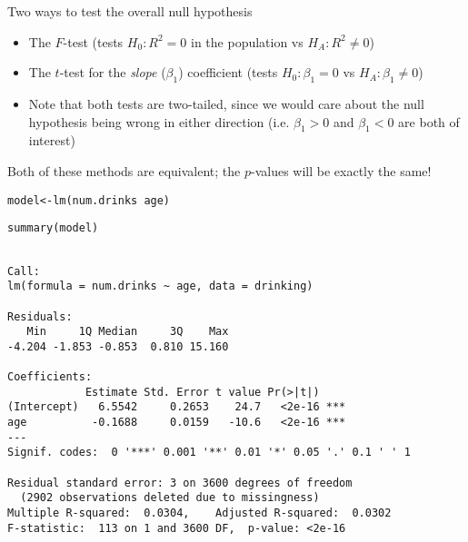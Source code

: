 \documentclass{beamer}\usepackage[]{graphicx}\usepackage[]{color}
\makeatletter
\newcommand{\hlopt}[1]{\textcolor[rgb]{1,0.894,0.769}{#1}}%
\newcommand{\hlstd}[1]{\textcolor[rgb]{1,0.894,0.769}{#1}}%
\newcommand{\hlkwb}[1]{\textcolor[rgb]{0.804,0.776,0.451}{#1}}%
\newcommand{\hlkwd}[1]{\textcolor[rgb]{1,0.78,0.769}{#1}}%
\newenvironment{kframe}{%
 \def\at@end@of@kframe{}%
 \ifinner\ifhmode%
  \def\at@end@of@kframe{\end{minipage}}%
  \begin{minipage}{\columnwidth}%
 \fi\fi%
 \def\FrameCommand##1{\hskip\@totalleftmargin \hskip-\fboxsep
 \colorbox{shadecolor}{##1}\hskip-\fboxsep
     \hskip-\linewidth \hskip-\@totalleftmargin \hskip\columnwidth}%
 \MakeFramed {\advance\hsize-\width
   \@totalleftmargin\z@ \linewidth\hsize
   \@setminipage}}%
 {\par\unskip\endMakeFramed%
 \at@end@of@kframe}
\newenvironment{knitrout}{}{} %
\makeatother
\begin{document}
\begin{darkframes}
    \begin{frame}{Two ways to test the overall null hypothesis}
      \begin{itemize}
        \item The $F$-test (tests $H_0:R^2=0$ in the population vs $H_A:R^2\neq 0$)
        \item The $t$-test for the \emph{slope} ($\beta_1$) coefficient (tests $H_0:\beta_1=0$ vs $H_A:\beta_1\neq 0$)
        \item Note that both tests are two-tailed, since we would care about the null hypothesis being wrong in either direction (i.e. $\beta_1>0$ and $\beta_1<0$ are both of interest)
      \end{itemize}
      \pause
      Both of these methods are equivalent; the $p$-values will be exactly the same!
    \end{frame}

    \begin{frame}[fragile]
      \fontsize{9}{9}\selectfont
\begin{knitrout}
\color{fgcolor}\begin{kframe}
\begin{alltt}
\hlstd{model} \hlkwb{<-} \hlkwd{lm}\hlstd{(num.drinks} \hlopt{~} \hlstd{age)}
\end{alltt}


{\ttfamily\noindent\bfseries\color{errorcolor}{Error in eval(predvars, data, env): object 'num.drinks' not found}}\begin{alltt}
\hlkwd{summary}\hlstd{(model)}
\end{alltt}
\begin{verbatim}

Call:
lm(formula = num.drinks ~ age, data = drinking)

Residuals:
   Min     1Q Median     3Q    Max 
-4.204 -1.853 -0.853  0.810 15.160 

Coefficients:
            Estimate Std. Error t value Pr(>|t|)    
(Intercept)   6.5542     0.2653    24.7   <2e-16 ***
age          -0.1688     0.0159   -10.6   <2e-16 ***
---
Signif. codes:  0 '***' 0.001 '**' 0.01 '*' 0.05 '.' 0.1 ' ' 1

Residual standard error: 3 on 3600 degrees of freedom
  (2902 observations deleted due to missingness)
Multiple R-squared:  0.0304,	Adjusted R-squared:  0.0302 
F-statistic:  113 on 1 and 3600 DF,  p-value: <2e-16
\end{verbatim}
\end{kframe}
\end{knitrout}
    \end{frame}


\end{darkframes}
\end{document}
